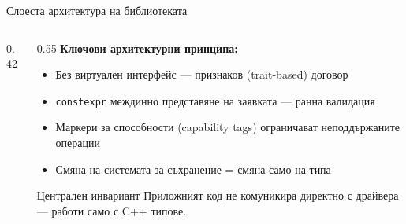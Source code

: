 \documentclass[aspectratio=169,12pt]{beamer}
\begin{document}
\begin{frame}{Слоеста архитектура на библиотеката}
    \begin{columns}[T]
        \begin{column}{0.42\textwidth}
            \centering
        \end{column}
        \begin{column}{0.55\textwidth}
            \textbf{Ключови архитектурни принципа:}
            \begin{itemize}\footnotesize
                \setlength{\itemsep}{0.15em}
                \item Без виртуален интерфейс --- признаков (trait-based) договор
                \item \texttt{constexpr} междинно представяне на заявката --- ранна валидация
                \item Маркери за способности (capability tags) ограничават неподдържаните операции
                \item Смяна на системата за съхранение = смяна само на типа
            \end{itemize}
            \begin{alertblock}{Централен инвариант}
                {\footnotesize Приложният код не комуникира директно с драйвера --- работи само с C++ типове.}
            \end{alertblock}
        \end{column}
    \end{columns}
\end{frame}
\end{document}
